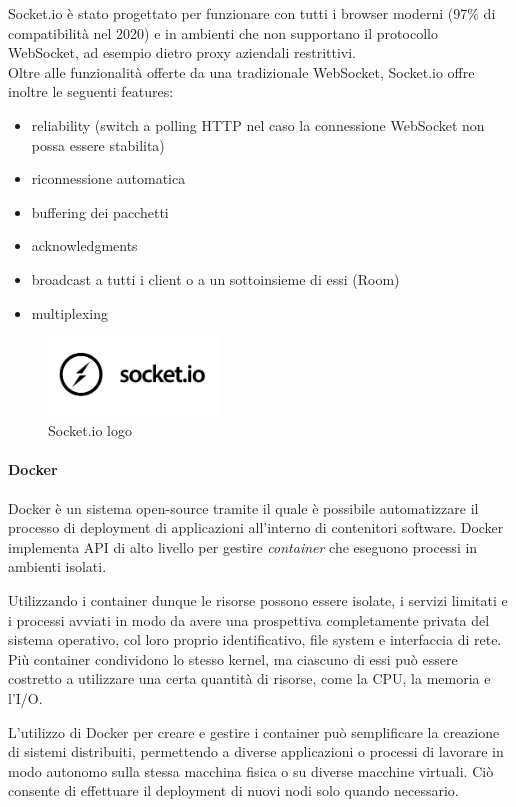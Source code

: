 Socket.io è stato progettato per funzionare con tutti i browser moderni (97\% di compatibilità nel 2020) e in ambienti che non
supportano il protocollo WebSocket, ad esempio dietro proxy aziendali restrittivi.\\[\baselineskip]\indent
Oltre alle funzionalità offerte da una tradizionale WebSocket, Socket.io offre inoltre le seguenti features:
\begin{itemize}
    \item reliability (switch a polling HTTP nel caso la connessione WebSocket non possa essere stabilita)
    \item riconnessione automatica
    \item buffering dei pacchetti
    \item acknowledgments
    \item broadcast a tutti i client o a un sottoinsieme di essi (Room)
    \item multiplexing
\end{itemize}

\begin{figure}[H]
\centering
\includegraphics[width=0.4\textwidth]{img/logos/socketIO_logo.jpg}
\caption{Socket.io logo}
\label{fig:socketio}
\end{figure}

\paragraph{Docker}
Docker è un sistema open-source tramite il quale è possibile automatizzare il processo di deployment di applicazioni all'interno di contenitori software.
Docker implementa API di alto livello per gestire \emph{container} che eseguono processi in ambienti isolati.

Utilizzando i container dunque le risorse possono essere isolate, i servizi limitati e i processi avviati in modo da avere una prospettiva completamente privata del sistema operativo, col loro proprio identificativo, file system e interfaccia di rete. Più container condividono lo stesso kernel, ma ciascuno di essi può essere costretto a utilizzare una certa quantità di risorse, come la CPU, la memoria e l'I/O.

L'utilizzo di Docker per creare e gestire i container può semplificare la creazione di sistemi distribuiti, permettendo a diverse applicazioni o processi di lavorare in modo autonomo sulla stessa macchina fisica o su diverse macchine virtuali. Ciò consente di effettuare il deployment di nuovi nodi solo quando necessario.

